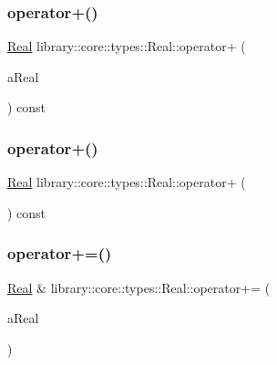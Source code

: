 \mbox{\label{classlibrary_1_1core_1_1types_1_1_real_aee62d1d76e3b0ba37dc9bebdbdcdaaf7}} 
\subsubsection{\texorpdfstring{operator+()}{operator+()}\hspace{0.1cm}{\footnotesize\ttfamily [2/3]}}
{\footnotesize\ttfamily \hyperlink{classlibrary_1_1core_1_1types_1_1_real}{Real} library\+::core\+::types\+::\+Real\+::operator+ (\begin{DoxyParamCaption}\item[{const \hyperlink{classlibrary_1_1core_1_1types_1_1_real_a9c5c8826b7e5a8e39544d23fea6c0e1c}{Real\+::\+Value\+Type} \&}]{a\+Real }\end{DoxyParamCaption}) const}

\mbox{\label{classlibrary_1_1core_1_1types_1_1_real_a7f39b72df1d66f354dce558a99dc2da5}} 
\subsubsection{\texorpdfstring{operator+()}{operator+()}\hspace{0.1cm}{\footnotesize\ttfamily [3/3]}}
{\footnotesize\ttfamily \hyperlink{classlibrary_1_1core_1_1types_1_1_real}{Real} library\+::core\+::types\+::\+Real\+::operator+ (\begin{DoxyParamCaption}{ }\end{DoxyParamCaption}) const}

\mbox{\label{classlibrary_1_1core_1_1types_1_1_real_a9d6119549877717ef91876e1e53c78f9}} 
\subsubsection{\texorpdfstring{operator+=()}{operator+=()}\hspace{0.1cm}{\footnotesize\ttfamily [1/2]}}
{\footnotesize\ttfamily \hyperlink{classlibrary_1_1core_1_1types_1_1_real}{Real} \& library\+::core\+::types\+::\+Real\+::operator+= (\begin{DoxyParamCaption}\item[{const \hyperlink{classlibrary_1_1core_1_1types_1_1_real}{Real} \&}]{a\+Real }\end{DoxyParamCaption})}

